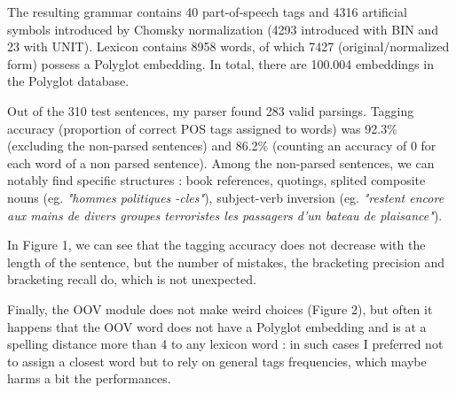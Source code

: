\documentclass[8pt,twocolumn,letterpaper]{article}
\begin{document}
The resulting grammar contains 40 part-of-speech tags and 4316 artificial symbols introduced  by Chomsky normalization (4293 introduced with BIN and 23 with UNIT). Lexicon contains 8958 words, of which 7427 (original/normalized form) possess a Polyglot embedding. In total, there are 100.004 embeddings in the Polyglot database.

Out of the 310 test sentences, my parser found 283 valid parsings. Tagging accuracy (proportion of correct POS tags assigned to words) was 92.3\% (excluding the non-parsed sentences) and 86.2\% (counting an accuracy of 0 for each word of a non parsed sentence).  Among the non-parsed sentences, we can notably find specific structures : book references, quotings, splited composite nouns (eg. \textit{"hommes politiques -cles"}), subject-verb inversion (eg. \textit{"restent encore aux mains de divers groupes terroristes les passagers d'un bateau de plaisance"}). 

In Figure 1, we can see that the tagging accuracy does not decrease with the length of the sentence, but the number of mistakes, the bracketing precision and bracketing recall do, which is not unexpected.  

Finally, the OOV module does not make weird choices (Figure 2), but often it happens that the OOV word does not have a Polyglot embedding and is at a spelling distance more than 4 to any lexicon word : in such cases I preferred not to assign a closest word but to rely on general tags frequencies, which maybe harms a bit the performances. 
\end{document}
